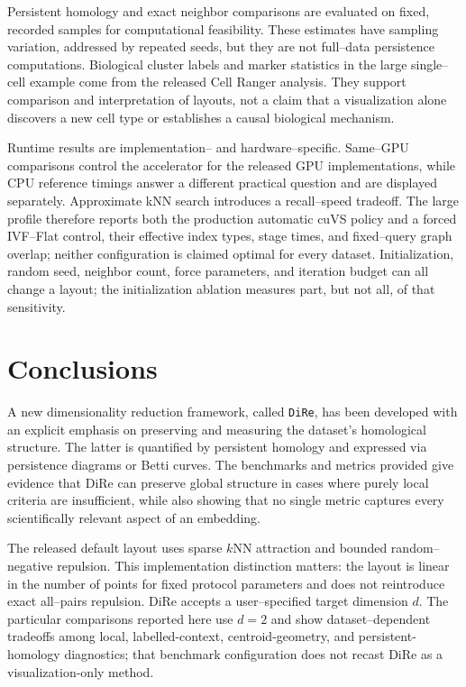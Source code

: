 \documentclass[11pt]{article}
\begin{document}
Persistent homology and exact neighbor comparisons are evaluated on fixed,
recorded samples for computational feasibility. These estimates have sampling
variation, addressed by repeated seeds, but they are not full--data persistence
computations. Biological cluster labels and marker statistics in the large
single--cell example come from the released Cell Ranger analysis. They support
comparison and interpretation of layouts, not a claim that a visualization
alone discovers a new cell type or establishes a causal biological mechanism.

Runtime results are implementation-- and hardware--specific. Same--GPU
comparisons control the accelerator for the released GPU implementations, while
CPU reference timings answer a different practical question and are displayed
separately. Approximate kNN search introduces a recall--speed tradeoff. The
large profile therefore reports both the production automatic cuVS policy and
a forced IVF--Flat control, their effective index types, stage times, and
fixed--query graph overlap; neither configuration is claimed optimal for every
dataset. Initialization, random seed, neighbor
count, force parameters, and iteration budget can all change a layout; the
initialization ablation measures part, but not all, of that sensitivity.

\section{Conclusions}

A new dimensionality reduction framework, called \texttt{DiRe}, has been developed with an explicit emphasis on preserving and measuring the dataset's homological structure. The latter is quantified by persistent homology and expressed via persistence diagrams or Betti curves. The benchmarks and metrics provided give evidence that DiRe can preserve global structure in cases where purely local criteria are insufficient, while also showing that no single metric captures every scientifically relevant aspect of an embedding.

The released default layout uses sparse $k$NN attraction and bounded
random--negative repulsion. This implementation distinction matters: the
layout is linear in the number of points for fixed protocol parameters and
does not reintroduce exact all--pairs repulsion. DiRe accepts a user--specified
target dimension $d$. The particular comparisons reported here use $d=2$ and
show dataset--dependent tradeoffs among local, labelled-context,
centroid-geometry, and persistent-homology diagnostics; that benchmark
configuration does not recast DiRe as a visualization-only method.
\end{document}
